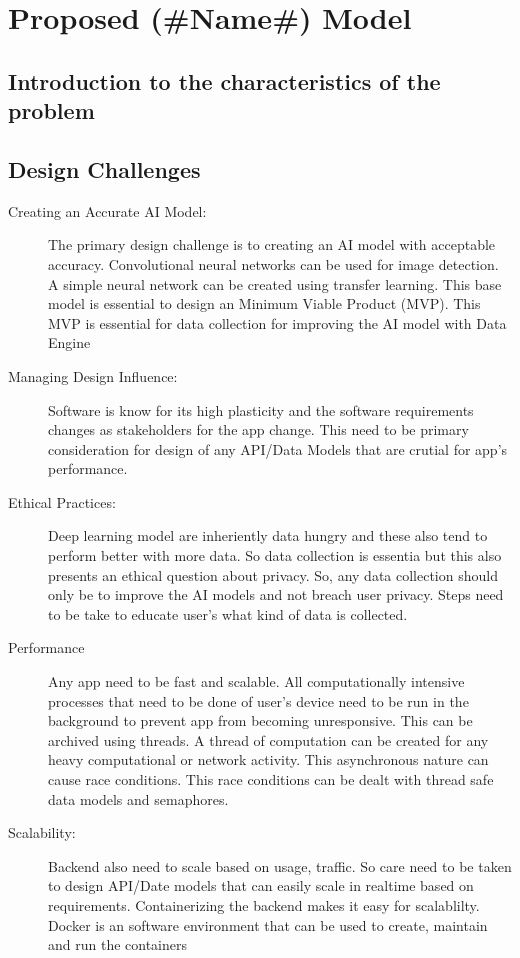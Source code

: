\documentclass[../Report.tex]{subfiles}
\begin{document}
\chapter{Proposed (\#Name\#) Model}

\section{Introduction to the characteristics of the problem}

\section{Design Challenges}
\begin{description}
    \item[Creating an Accurate AI Model: ] The primary design challenge is to creating an AI model with acceptable accuracy. Convolutional
    neural networks can be used for image detection. A simple neural network can be created using transfer learning. This base model is 
    essential to design an Minimum Viable Product (MVP). This MVP is essential for data collection for improving the AI model with Data 
    Engine
    
    \item[Managing Design Influence: ] Software is know for its high plasticity and the software requirements changes as stakeholders for
    the app change. This need to be primary consideration for design of any API/Data Models that are crutial for app's performance.

    \item[Ethical Practices: ] Deep learning model are inheriently data hungry and these also tend to perform better with more data. So
    data collection is essentia but this also presents an ethical question about privacy. So, any data collection should only be to 
    improve the AI models and not breach user privacy. Steps need to be take to educate user's what kind of data is collected.

    \item[Performance] Any app need to be fast and scalable. All computationally intensive processes that need to be 
    done of user's device need to be run in the background to prevent app from becoming unresponsive. This can be archived using 
    threads. A thread of computation can be created for any heavy computational or network activity. This asynchronous nature can 
    cause race conditions. This race conditions can be dealt with thread safe data models and semaphores.
    
    \item[Scalability: ]
    Backend also need to scale based on usage, traffic. So care need to be taken to design API/Date models that can easily scale in 
    realtime based on requirements. Containerizing the backend makes it easy for scalablilty. Docker is an software environment that
    can be used to create, maintain and run the containers
\end{description}
\end{document}
